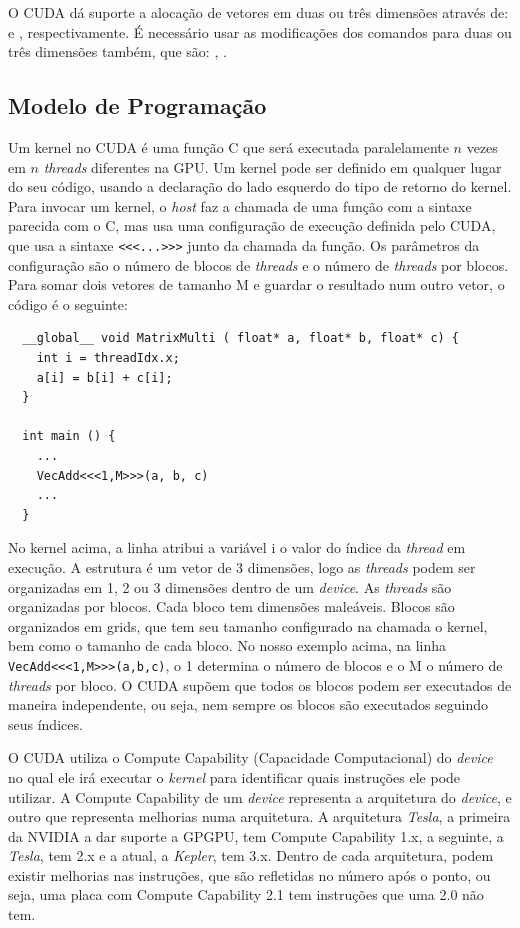 O CUDA dá suporte a alocação de vetores em duas ou três dimensões através de:  e
, respectivamente. É necessário usar as modificações dos comandos  para
duas ou três dimensões também, que são: , .

\subsection{Modelo de Programação}
Um kernel no CUDA é uma função C que será executada paralelamente $n$ vezes em $n$ \textit{threads} diferentes na GPU. Um kernel pode ser
definido em qualquer lugar do seu código, usando a declaração  do lado esquerdo do tipo de retorno do kernel.
Para invocar um kernel, o \textit{host} faz a chamada de uma função com a sintaxe parecida com o C, mas usa uma configuração de
execução definida pelo CUDA, que usa a sintaxe \verb#<<<...>>># junto da chamada da função. Os parâmetros da configuração são
o número de blocos de \textit{threads} e o número de \textit{threads} por blocos. Para somar dois vetores de tamanho M e guardar o resultado num
outro vetor, o código é o seguinte:

\begin{lstlisting}
  __global__ void MatrixMulti ( float* a, float* b, float* c) {
    int i = threadIdx.x;
    a[i] = b[i] + c[i];
  }

  int main () {
    ...
    VecAdd<<<1,M>>>(a, b, c)
    ...
  }
\end{lstlisting}

No kernel acima, a linha  atribui a variável i o valor do índice da \textit{thread} em execução.
A estrutura  é um vetor de 3 dimensões, logo as \textit{threads} podem ser organizadas em 1, 2 ou 3 dimensões dentro de um
\textit{device}. As \textit{threads} são organizadas por blocos. Cada bloco tem dimensões maleáveis. Blocos são organizados em
grids, que tem seu tamanho configurado na chamada o kernel, bem como o tamanho de cada bloco. No nosso exemplo acima, na linha
\verb#VecAdd<<<1,M>>>(a,b,c)#, o 1 determina o número de blocos e o M o número de \textit{threads} por bloco.
O CUDA supõem que todos os blocos podem ser executados de maneira independente,
ou seja, nem sempre os blocos são executados seguindo seus índices.

O CUDA utiliza o Compute Capability (Capacidade Computacional) do \textit{device} no qual ele irá executar o \textit{kernel}
para identificar quais instruções ele pode utilizar. A Compute Capability de um \textit{device}
representa a arquitetura do \textit{device}, e outro que representa melhorias numa arquitetura.
A arquitetura \textit{Tesla}, a primeira da NVIDIA a dar suporte a GPGPU, tem Compute Capability 1.x, a seguinte, a \textit{Tesla},
tem 2.x e a atual, a \textit{Kepler}, tem 3.x. Dentro de cada arquitetura, podem existir melhorias nas instruções, que são
refletidas no número após o ponto, ou seja, uma placa com Compute Capability 2.1 tem instruções que uma 2.0 não tem.

